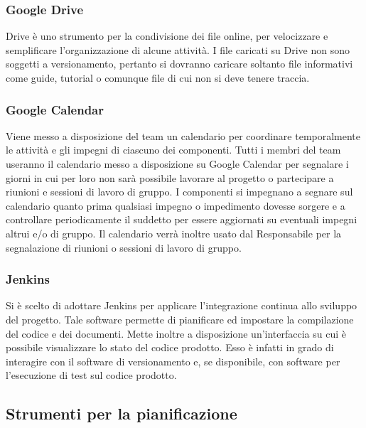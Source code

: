 \subsubsection{Google Drive}

\label{gdrive}
Drive è uno strumento per la condivisione dei file online, per velocizzare e semplificare l'organizzazione di alcune attività. I file caricati su Drive non sono soggetti a versionamento, pertanto si dovranno caricare soltanto file informativi come guide, tutorial o comunque file di cui non si deve tenere traccia.



\subsubsection{Google Calendar}
\label{4.2}
Viene messo a disposizione del team un calendario per coordinare temporalmente le attività e gli impegni di ciascuno dei componenti.
Tutti i membri del team useranno il calendario messo a disposizione su Google Calendar per segnalare i giorni in cui per loro non sarà possibile lavorare al progetto o partecipare a riunioni e sessioni di lavoro di gruppo. I componenti si impegnano a segnare sul calendario quanto prima qualsiasi impegno o impedimento dovesse sorgere e a controllare periodicamente il suddetto per essere aggiornati su eventuali impegni altrui e/o di gruppo.
Il calendario verrà inoltre usato dal Responsabile per la segnalazione di riunioni o sessioni di lavoro di gruppo.

\subsubsection{Jenkins}
\label{}
Si è scelto di adottare Jenkins per applicare l’integrazione continua allo sviluppo del progetto.
Tale software permette di pianificare ed impostare la compilazione del codice e dei documenti. 
Mette inoltre a disposizione un'interfaccia su cui è possibile visualizzare lo stato del codice prodotto. 
Esso è infatti in grado di interagire con il software di versionamento e, se disponibile, con software per l’esecuzione di test sul codice prodotto.



\subsection{Strumenti per la pianificazione}
\label{}
